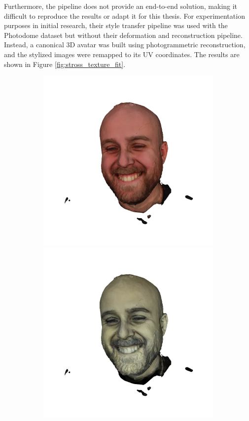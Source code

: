 Furthermore, the pipeline does not provide an end-to-end solution, making it difficult to reproduce the results or adapt it for this thesis. For experimentation purposes in initial research, their style transfer pipeline was used with the Photodome dataset but without their deformation and reconstruction pipeline. Instead, a canonical 3D avatar was built using photogrammetric reconstruction, and the stylized images were remapped to its UV coordinates. The results are shown in Figure \ref{fig:stross_texture_fit}.

\begin{figure}
    \centering
    \begin{subfigure}{0.18\linewidth}
        \includegraphics[width=\textwidth]{Figures/failed/stross/3d/snapshot09.png}
        \includegraphics[width=\textwidth]{Figures/failed/stross/3d/snapshot10.png}

\end{subfigure}
\end{figure}
